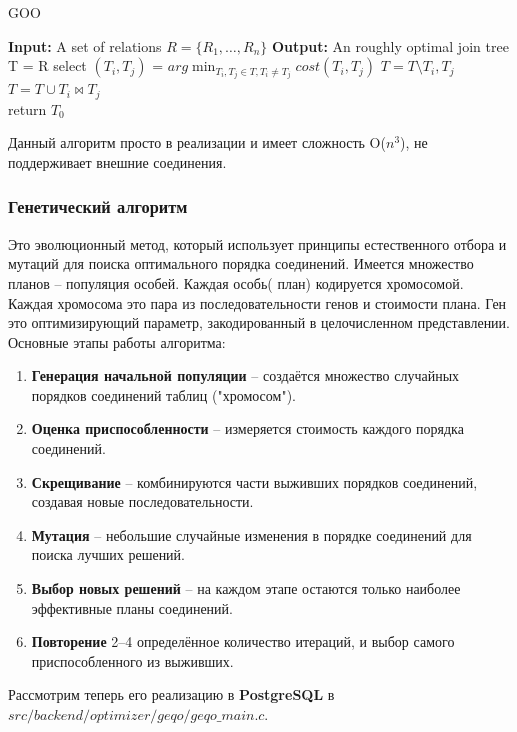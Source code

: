 \documentclass[12pt]{article}
\begin{document}
\begin{flushleft}
\begin{algorithm}
    GOO
    \begin{algorithmic}[1]
        \State \textbf{Input:} A set of relations $R = \{R_1, \dots, R_n\}$
        \State \textbf{Output:} An roughly optimal join tree
        \State T = R
            \State select $(T_i,T_j)$ = $arg \min_{T_i, T_j \in T, T_i \neq T_j} cost(T_i, T_j)$
            \State $T = T \setminus {T_i, T_j}$
            \State $T = T \cup {T_i \Join T_j}$
        \EndWhile \\
        return $T_0$
    \end{algorithmic}
\end{algorithm}

Данный алгоритм просто в реализации и имеет сложность O($n^3$), не поддерживает
внешние соединения.

\centering \subsubsection*{\textbf{Генетический алгоритм}}
\raggedright  
Это эволюционный метод, который использует принципы естественного отбора и мутаций для поиска оптимального порядка соединений.  
Имеется множество планов -- популяция особей. Каждая особь( план) кодируется хромосомой.
Каждая хромосома это пара из последовательности генов и стоимости плана. Ген это оптимизирующий параметр,
закодированный в целочисленном представлении.
Основные этапы работы алгоритма:
\begin{enumerate}
    \item \textbf{Генерация начальной популяции} – создаётся множество случайных порядков соединений таблиц ("хромосом").
    \item \textbf{Оценка приспособленности} – измеряется стоимость каждого порядка соединений.
    \item \textbf{Скрещивание} – комбинируются части выживших порядков соединений, создавая новые последовательности.
    \item \textbf{Мутация} – небольшие случайные изменения в порядке соединений для поиска лучших решений.
    \item \textbf{Выбор новых решений} – на каждом этапе остаются только наиболее эффективные планы соединений.
    \item \textbf{Повторение} 2--4 определённое количество итераций, и выбор самого приспособленного из выживших.
\end{enumerate}

Рассмотрим теперь его реализацию в \textbf{PostgreSQL} в $src/backend/optimizer/geqo/geqo\_main.c$.


\end{flushleft}
\end{document}
